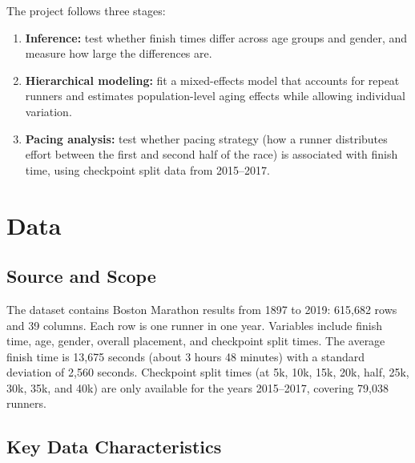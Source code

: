 \documentclass[conference]{IEEEtran}
\begin{document}
The project follows three stages:
\begin{enumerate}
    \item \textbf{Inference:} test whether finish times differ across age groups and gender, and measure how large the differences are.
    \item \textbf{Hierarchical modeling:} fit a mixed-effects model that accounts for repeat runners and estimates population-level aging effects while allowing individual variation.
    \item \textbf{Pacing analysis:} test whether pacing strategy (how a runner distributes effort between the first and second half of the race) is associated with finish time, using checkpoint split data from 2015--2017.
\end{enumerate}

\section{Data}

\subsection{Source and Scope}

The dataset contains Boston Marathon results from 1897 to 2019: 615,682 rows and 39 columns. Each row is one runner in one year. Variables include finish time, age, gender, overall placement, and checkpoint split times. The average finish time is 13,675 seconds (about 3 hours 48 minutes) with a standard deviation of 2,560 seconds. Checkpoint split times (at 5k, 10k, 15k, 20k, half, 25k, 30k, 35k, and 40k) are only available for the years 2015--2017, covering 79,038 runners.

\subsection{Key Data Characteristics}
\end{document}
